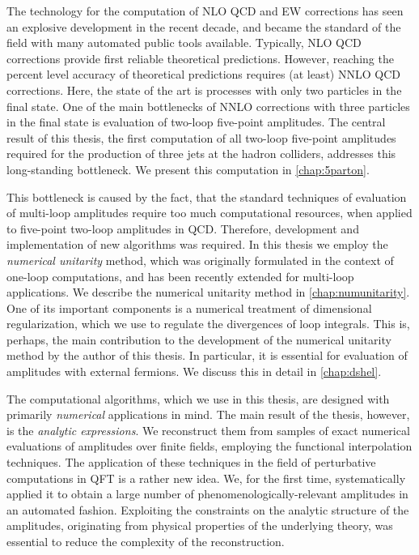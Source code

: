 The technology for the computation of NLO QCD and EW corrections has seen an explosive development
in the recent decade, and became the standard of the field with many automated public tools available.
Typically, NLO QCD corrections provide first reliable theoretical predictions.
However, reaching the percent level accuracy of theoretical predictions requires (at least) NNLO QCD corrections.
Here, the state of the art is processes with only two particles in the final state.
One of the main bottlenecks of NNLO corrections with three particles in the final state is evaluation of two-loop five-point amplitudes.
The central result of this thesis, the first computation of all two-loop five-point amplitudes required for the production
of three jets at the hadron colliders, addresses this long-standing bottleneck. We present this computation in  \cref{chap:5parton}.

This bottleneck is caused by the fact,
that the standard techniques of evaluation of multi-loop amplitudes require too much computational resources,
when applied to five-point two-loop amplitudes in QCD.
Therefore, development and implementation of new algorithms was required.
In this thesis we employ the \emph{numerical unitarity} method, which
was originally formulated in the context of one-loop computations,
and has been recently extended for multi-loop applications.
We describe the numerical unitarity method in \cref{chap:numunitarity}.
One of its important components is a numerical treatment of dimensional regularization, which we use to regulate the divergences of loop integrals.
This is, perhaps, the main contribution to the development of the numerical unitarity method by the author of this thesis.
In particular, it is essential for evaluation of amplitudes with external fermions.
We discuss this in detail in \cref{chap:dshel}.

The computational algorithms, which we use in this thesis, are designed with primarily \emph{numerical} applications in mind.
The main result of the thesis, however, is the \emph{analytic expressions}.
We reconstruct them from samples of exact numerical evaluations of amplitudes over finite fields,
employing the functional interpolation techniques.
The application of these techniques in the field of perturbative computations in QFT is a rather new idea.
We, for the first time, systematically applied it to obtain a large number of phenomenologically-relevant amplitudes in an automated fashion. 
Exploiting the constraints on the analytic structure of the amplitudes, originating
from physical properties of the underlying theory, was essential to reduce the complexity of the reconstruction.

